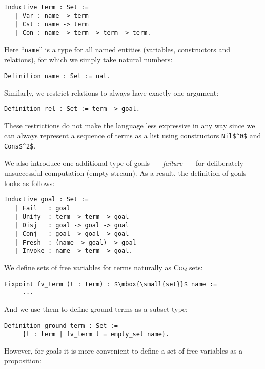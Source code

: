 \begin{lstlisting}[language=Coq] 
   Inductive term : Set :=
   | Var : name -> term
   | Cst : name -> term
   | Con : name -> term -> term -> term.
\end{lstlisting}

Here ``\lstinline[language=Coq]{name}'' is a type for all named entities (variables, constructors and relations), for which we simply take natural numbers:

\begin{lstlisting}[language=Coq]
  Definition name : Set := nat.
\end{lstlisting}

Similarly, we restrict relations to always have exactly one argument:

\begin{lstlisting}[language=Coq]
   Definition rel : Set := term -> goal.
\end{lstlisting}

These restrictions do not make the language less expressive in any way since we can always represent a sequence of terms as a list using constructors \lstinline|Nil$^0$| and \lstinline|Cons$^2$|.

We also introduce one additional type of goals~--- \emph{failure}~--- for deliberately unsuccessful computation (empty stream). As a result, the definition of goals looks as follows:

\begin{lstlisting}[language=Coq] 
   Inductive goal : Set :=
   | Fail   : goal
   | Unify  : term -> term -> goal
   | Disj   : goal -> goal -> goal
   | Conj   : goal -> goal -> goal
   | Fresh  : (name -> goal) -> goal
   | Invoke : name -> term -> goal.
\end{lstlisting}

We define sets of free variables for terms naturally as \textsc{Coq} sets: 

\begin{lstlisting}[language=Coq,mathescape=true] 
   Fixpoint fv_term (t : term) : $\mbox{\small{set}}$ name :=
     ...
\end{lstlisting}

And we use them to define ground terms as a subset type:

\begin{lstlisting}[language=Coq]
   Definition ground_term : Set :=
     {t : term | fv_term t = empty_set name}.
\end{lstlisting}

However, for goals it is more convenient to define a set of free variables as a proposition:

